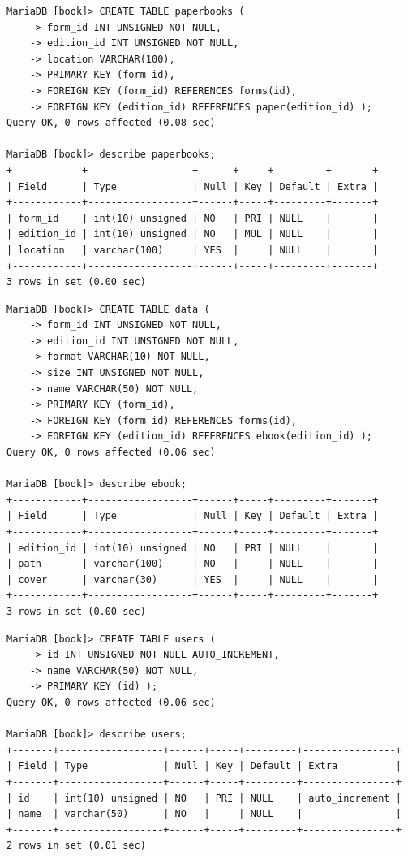 \documentclass{assignment}
\begin{document}
\begin{verbatim}
MariaDB [book]> CREATE TABLE paperbooks (
    -> form_id INT UNSIGNED NOT NULL,
    -> edition_id INT UNSIGNED NOT NULL,
    -> location VARCHAR(100),
    -> PRIMARY KEY (form_id),
    -> FOREIGN KEY (form_id) REFERENCES forms(id),
    -> FOREIGN KEY (edition_id) REFERENCES paper(edition_id) );
Query OK, 0 rows affected (0.08 sec)

MariaDB [book]> describe paperbooks;
+------------+------------------+------+-----+---------+-------+
| Field      | Type             | Null | Key | Default | Extra |
+------------+------------------+------+-----+---------+-------+
| form_id    | int(10) unsigned | NO   | PRI | NULL    |       |
| edition_id | int(10) unsigned | NO   | MUL | NULL    |       |
| location   | varchar(100)     | YES  |     | NULL    |       |
+------------+------------------+------+-----+---------+-------+
3 rows in set (0.00 sec)
\end{verbatim}

\begin{verbatim}
MariaDB [book]> CREATE TABLE data ( 
    -> form_id INT UNSIGNED NOT NULL, 
    -> edition_id INT UNSIGNED NOT NULL, 
    -> format VARCHAR(10) NOT NULL, 
    -> size INT UNSIGNED NOT NULL, 
    -> name VARCHAR(50) NOT NULL, 
    -> PRIMARY KEY (form_id), 
    -> FOREIGN KEY (form_id) REFERENCES forms(id), 
    -> FOREIGN KEY (edition_id) REFERENCES ebook(edition_id) );
Query OK, 0 rows affected (0.06 sec)

MariaDB [book]> describe ebook;
+------------+------------------+------+-----+---------+-------+
| Field      | Type             | Null | Key | Default | Extra |
+------------+------------------+------+-----+---------+-------+
| edition_id | int(10) unsigned | NO   | PRI | NULL    |       |
| path       | varchar(100)     | NO   |     | NULL    |       |
| cover      | varchar(30)      | YES  |     | NULL    |       |
+------------+------------------+------+-----+---------+-------+
3 rows in set (0.00 sec)
\end{verbatim}

\begin{verbatim}
MariaDB [book]> CREATE TABLE users (
    -> id INT UNSIGNED NOT NULL AUTO_INCREMENT,
    -> name VARCHAR(50) NOT NULL,
    -> PRIMARY KEY (id) );
Query OK, 0 rows affected (0.06 sec)

MariaDB [book]> describe users;
+-------+------------------+------+-----+---------+----------------+
| Field | Type             | Null | Key | Default | Extra          |
+-------+------------------+------+-----+---------+----------------+
| id    | int(10) unsigned | NO   | PRI | NULL    | auto_increment |
| name  | varchar(50)      | NO   |     | NULL    |                |
+-------+------------------+------+-----+---------+----------------+
2 rows in set (0.01 sec)

\end{verbatim}
\end{document}

